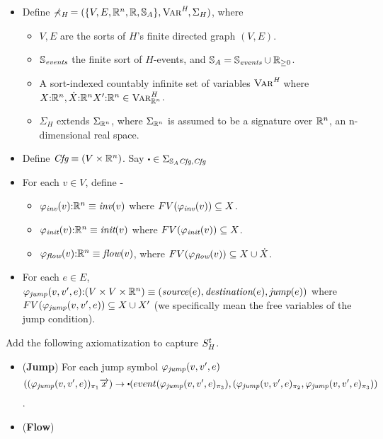 \documentclass[]{article}
\begin{document}
\begin{itemize}
  \item Define $\mathbb{\Sigma_\textit{H}} = (\{V, E, \mathbb{R}^{n}, \mathbb{R}, \mathbb{S}_{A}\}, \textsc{Var}^\textit{H}, \Sigma_H)$, where
    \begin{itemize}
      \item $V, E$ are the sorts of $H$'s finite directed graph $(V,E)$.
      \item $\mathbb{S}_{\textit{events}}$ the finite sort of $H$-events, and $\mathbb{S}_{A} =
        \mathbb{S}_{\textit{events}} \cup \mathbb{R}_{\geq 0}$.
      \item A sort-indexed countably infinite set of variables $\textsc{Var}^\textit{H}$ where
        $X\mathord{:} \mathbb{R}^{n}, \dot{X} \mathord{:} \mathbb{R}^{n} X' \mathord{:} \mathbb{R}^{n} \in \textsc{Var}^\textit{H}_{\mathbb{R}^{n}} $.
      \item $\Sigma_H$ extends $\Sigma_{\mathbb{R}^{n}}$, where
        $\Sigma_{\mathbb{R}^{n}}$ is assumed to be a signature over $\mathbb{R}^{n}$, an
        n-dimensional real space.
    \end{itemize}
  \item Define $\textit{Cfg} \equiv (V \times \mathbb{R}^{n})$. Say $\sbullet \in
    \Sigma_{\sortA \sortCfg, \sortCfg}$
  \item For each $v \in V$, define -
    \begin{itemize}
      \item $\varphi_{\textit{inv}}(v) \mathord{:} \mathbb{R}^{n} \equiv \textit{inv}(v)$ where $FV(\varphi_{\textit{inv}}(v)) \subseteq
        X$.
      \item $\varphi_{\textit{init}}(v) \mathord{:} \mathbb{R}^{n} \equiv \textit{init}(v)$ where $FV(\varphi_{\textit{init}}(v))
        \subseteq X$.
      \item $\varphi_{\textit{flow}}(v) \mathord{:} \mathbb{R}^{n} \equiv \textit{flow}(v)$, where $FV(\varphi_{\textit{flow}}(v)) \subseteq X \cup \dot{X}$.
    \end{itemize}
  \item For each $e \in E$, $\varphi_{\textit{jump}}(v,v',e) \mathord{:} (V \times V \times \mathbb{R}^{n}) \equiv
        (\textit{source}(e), \textit{destination}(e), \textit{jump}(e)) $ where
        $FV(\varphi_{\textit{jump}}(v,v',e)) \subseteq X \cup X'$ (we
        specifically mean the free variables of the jump condition).
\end{itemize}

Add the following axiomatization to capture $S^t_H$.
\begin{itemize}
  \item (\textbf{Jump}) For each jump symbol $\varphi_{\textit{jump}}(v,v',e)$
    $$ ((\phiJump(v,v',e))_{\pi_1} \overarr{x}) \to
    \sbullet(event(\phiJump(v,v',e)_{\pi_3}), (\phiJump(v,v',e)_{\pi_2},
    \phiJump(v,v',e)_{\pi_3})) $$.
  \item (\textbf{Flow})

\end{itemize}



%
\end{document}
